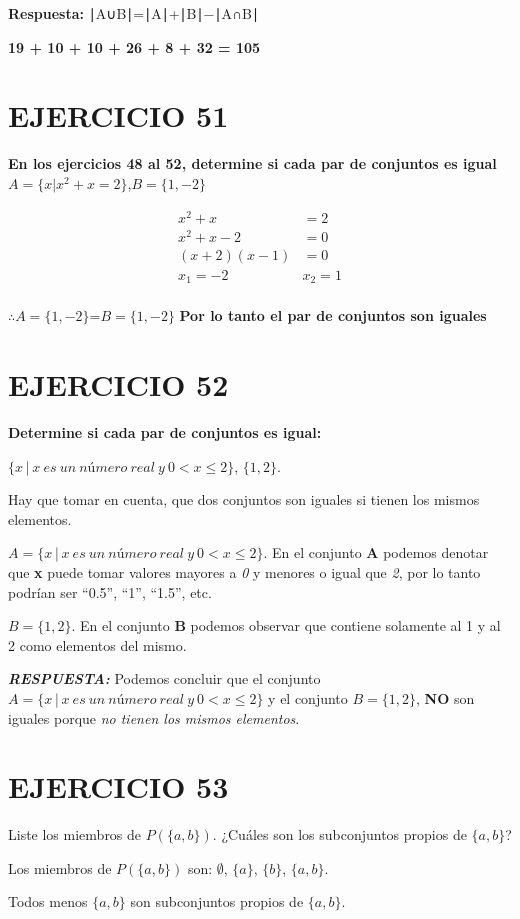 \documentclass[
  letterpaper,
  DIV=11,
  numbers=noendperiod]{scrartcl}
\begin{document}
\textbf{Respuesta:} ∣A∪B∣=∣A∣+∣B∣−∣A∩B∣

\textbf{19 + 10 + 10 + 26 + 8 + 32 = 105}

\hypertarget{ejercicio-51}{%
\section{EJERCICIO 51}\label{ejercicio-51}}

\textbf{En los ejercicios 48 al 52, determine si cada par de conjuntos
es igual} \(A=\{x|x^2+x=2\}\),\(B=\{1,-2\}\)

\[
\begin{align*}
x^2 + x &= 2 \\
x^2 + x - 2 &= 0 \\
(x + 2)(x - 1) &= 0 \\
x_1 = -2 \quad& x_2 = 1\\
\end{align*}
\]

\(\therefore A=\{1,-2\}\)=\(B=\{1,-2\}\) \textbf{Por lo tanto el par de
conjuntos son iguales}

\hypertarget{ejercicio-52}{%
\section{EJERCICIO 52}\label{ejercicio-52}}

\textbf{Determine si cada par de conjuntos es igual:}

\(\{x│ x\ es\ un\ número\ real\ y\ 0 < x \leq 2\}\), \(\{1,2\}\).

Hay que tomar en cuenta, que dos conjuntos son iguales si tienen los
mismos elementos.

\(A = \{x│ x\ es\ un\ número\ real\ y\ 0 < x \leq 2\}\). En el conjunto
\textbf{A} podemos denotar que \textbf{x} puede tomar valores mayores a
\emph{0} y menores o igual que \emph{2}, por lo tanto podrían ser
``0.5'', ``1'', ``1.5'', etc.

\(B = \{1,2\}\). En el conjunto \textbf{B} podemos observar que contiene
solamente al 1 y al 2 como elementos del mismo.

\textbf{\emph{RESPUESTA:}} Podemos concluir que el conjunto
\(A = \{x│ x\ es\ un\ número\ real\ y\ 0 < x \leq 2\}\) y el conjunto
\(B = \{1,2\}\), \textbf{NO} son iguales porque \emph{no tienen los
mismos elementos}.

\hypertarget{ejercicio-53}{%
\section{EJERCICIO 53}\label{ejercicio-53}}

Liste los miembros de \(P(\{a, b\})\). ¿Cuáles son los subconjuntos
propios de \(\{a, b\}\)?

Los miembros de \(P(\{a, b\})\) son: \(\emptyset\), \(\{a\}\),
\(\{b\}\), \(\{a,b\}\).

Todos menos \(\{a,b\}\) son subconjuntos propios de \(\{a,b\}\).
\end{document}
